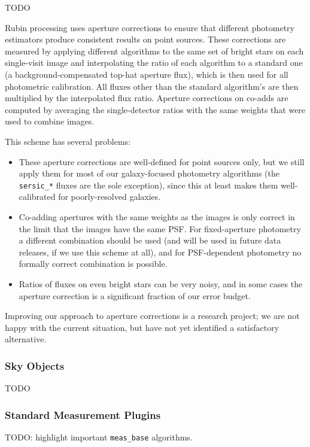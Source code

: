 TODO


Rubin processing uses aperture corrections to ensure that different photometry estimators produce consistent results on point sources.
These corrections are measured by applying different algorithms to the same set of bright stars on each single-visit image and interpolating the ratio of each algorithm to a standard one (a background-compensated top-hat aperture flux), which is then used for all photometric calibration.
All fluxes other than the standard algorithm's are then multiplied by the interpolated flux ratio.
Aperture corrections on co-adds are computed by averaging the single-detector ratios with the same weights that were used to combine images.

This scheme has several problems:

\begin{itemize}

    \item These aperture corrections are well-defined for point sources only, but we still apply them for most of our galaxy-focused photometry algorithms (the \texttt{sersic\_*} fluxes are the sole exception), since this at least makes them well-calibrated for poorly-resolved galaxies.

    \item Co-adding apertures with the same weights as the images is only correct in the limit that the images have the same PSF.
    For fixed-aperture photometry a different combination should be used (and will be used in future data releases, if we use this scheme at all), and for PSF-dependent photometry no formally correct combination is possible.

    \item Ratios of fluxes on even bright stars can be very noisy, and in some cases the aperture correction is a significant fraction of our error budget.

\end{itemize}

Improving our approach to aperture corrections is a research project; we are not happy with the current situation, but have not yet identified a satisfactory alternative.


\subsubsection{Sky Objects}

\label{sec:sky-objects}

TODO

\subsubsection{Standard Measurement Plugins}

TODO: highlight important \texttt{meas\_base} algorithms.








